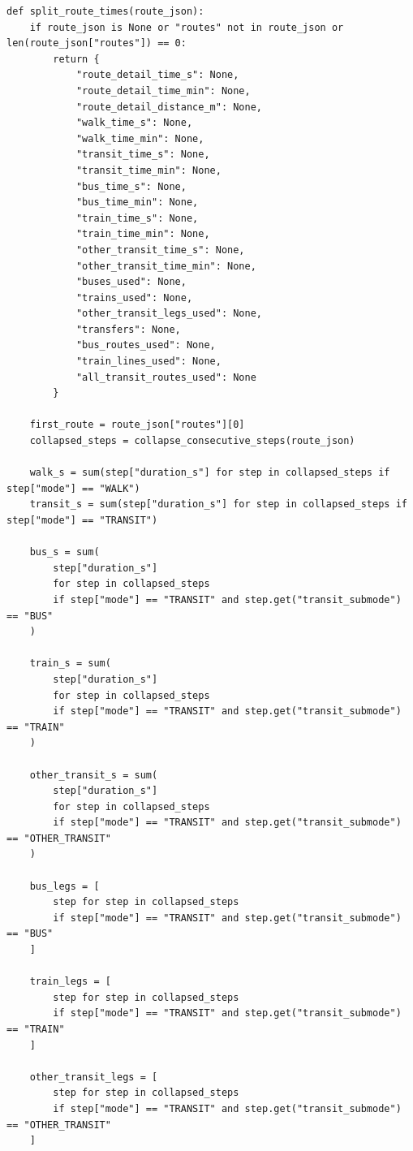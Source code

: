 \documentclass[11pt,a4paper]{article}
\begin{document}
\begin{appendices}
\begin{lstlisting}[style=pythonappendix, caption={Decomposition of route steps into journey-time components}, label={lst:route_decomposition}]
def split_route_times(route_json):
    if route_json is None or "routes" not in route_json or len(route_json["routes"]) == 0:
        return {
            "route_detail_time_s": None,
            "route_detail_time_min": None,
            "route_detail_distance_m": None,
            "walk_time_s": None,
            "walk_time_min": None,
            "transit_time_s": None,
            "transit_time_min": None,
            "bus_time_s": None,
            "bus_time_min": None,
            "train_time_s": None,
            "train_time_min": None,
            "other_transit_time_s": None,
            "other_transit_time_min": None,
            "buses_used": None,
            "trains_used": None,
            "other_transit_legs_used": None,
            "transfers": None,
            "bus_routes_used": None,
            "train_lines_used": None,
            "all_transit_routes_used": None
        }

    first_route = route_json["routes"][0]
    collapsed_steps = collapse_consecutive_steps(route_json)

    walk_s = sum(step["duration_s"] for step in collapsed_steps if step["mode"] == "WALK")
    transit_s = sum(step["duration_s"] for step in collapsed_steps if step["mode"] == "TRANSIT")

    bus_s = sum(
        step["duration_s"]
        for step in collapsed_steps
        if step["mode"] == "TRANSIT" and step.get("transit_submode") == "BUS"
    )

    train_s = sum(
        step["duration_s"]
        for step in collapsed_steps
        if step["mode"] == "TRANSIT" and step.get("transit_submode") == "TRAIN"
    )

    other_transit_s = sum(
        step["duration_s"]
        for step in collapsed_steps
        if step["mode"] == "TRANSIT" and step.get("transit_submode") == "OTHER_TRANSIT"
    )

    bus_legs = [
        step for step in collapsed_steps
        if step["mode"] == "TRANSIT" and step.get("transit_submode") == "BUS"
    ]

    train_legs = [
        step for step in collapsed_steps
        if step["mode"] == "TRANSIT" and step.get("transit_submode") == "TRAIN"
    ]

    other_transit_legs = [
        step for step in collapsed_steps
        if step["mode"] == "TRANSIT" and step.get("transit_submode") == "OTHER_TRANSIT"
    ]


\end{lstlisting}
\end{appendices}
\end{document}
